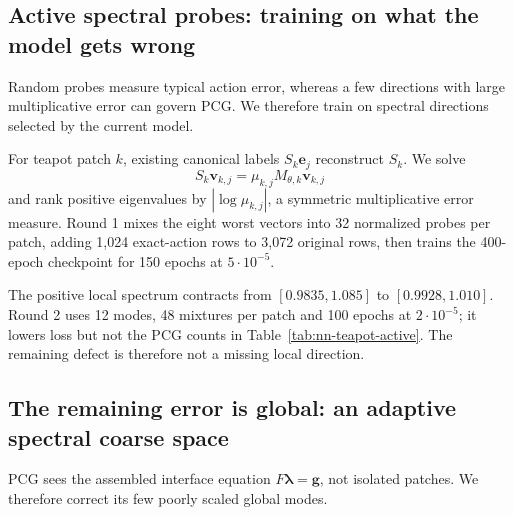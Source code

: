 \documentclass{article}
\newcommand{\vect}[1]{\boldsymbol{#1}}
\newcommand{\Sloc}[1]{S_{#1}}                    %
\newcommand{\Fschur}{F}                           %
\newcommand{\gschur}{\vect{g}}                    %
\newcommand{\lagmult}{\vect{\lambda}}             %
\theoremstyle{plain}
\numberwithin{equation}{section}
\begin{document}
\subsection{Active spectral probes: training on what the model gets wrong}
\label{subsec:nn-active-spectral}

Random probes measure typical action error, whereas a few directions with
large multiplicative error can govern PCG.  We therefore train on spectral
directions selected by the current model.

For teapot patch $k$, existing canonical labels $\Sloc{k}\vect e_j$
reconstruct $\Sloc{k}$.  We solve
\begin{equation}
    \Sloc{k}\vect v_{k,j}=\mu_{k,j}M_{\theta,k}\vect v_{k,j}
    \label{eq:nn-active-local-eigenproblem}
\end{equation}
and rank positive eigenvalues by $|\log\mu_{k,j}|$, a symmetric multiplicative
error measure.  Round 1 mixes the eight worst vectors into 32 normalized
probes per patch, adding 1,024 exact-action rows to 3,072 original rows, then
trains the 400-epoch checkpoint for 150 epochs at $5\cdot10^{-5}$.

The positive local spectrum contracts from $[0.9835,1.085]$ to
$[0.9928,1.010]$.  Round 2 uses 12 modes, 48 mixtures per patch and 100 epochs
at $2\cdot10^{-5}$; it lowers loss but not the PCG counts in
Table~\ref{tab:nn-teapot-active}.  The remaining defect is therefore not a
missing local direction.

\subsection{The remaining error is global: an adaptive spectral coarse space}
\label{subsec:nn-global-correction}

PCG sees the assembled interface equation $\Fschur\lagmult=\gschur$, not
isolated patches.  We therefore correct its few poorly scaled global modes.
\end{document}
